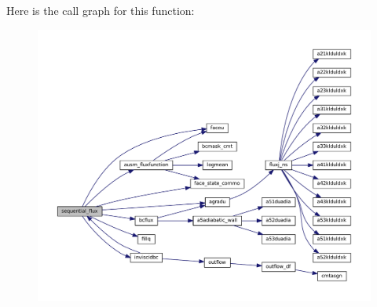 Here is the call graph for this function\-:\nopagebreak
\begin{figure}[H]
\begin{center}
\leavevmode
\includegraphics[width=350pt]{group__flux_ga4498a8903b8de21f2c0afd0d34c5e00c_cgraph}
\end{center}
\end{figure}


